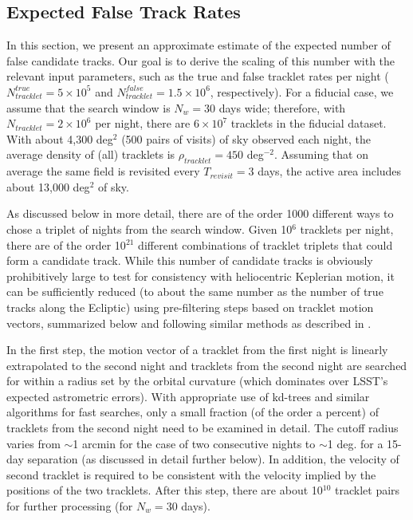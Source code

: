 \subsection{Expected False Track Rates \label{sec:tracks} }

In this section, we present an approximate estimate of the expected number of false candidate tracks.
Our goal is to derive the scaling of this number with the relevant input parameters, such as the true and false
tracklet rates per night ($N_{tracklet}^{true}=5\times10^5$ and $N_{tracklet}^{false}=1.5\times10^6$, respectively).
For a fiducial case, we assume that the search window is $N_w= 30$ days wide;  therefore, with $N_{tracklet} = 2\times10^6$
per night, there are $6\times10^7$ tracklets in the fiducial dataset. With about 4,300 deg$^2$ (500 pairs of visits)
of sky observed each night, the average density of (all) tracklets is $\rho_{tracklet} = 450$ deg$^{-2}$. Assuming
that on average the same field is revisited every $T_{revisit}=3$ days, the active area includes about 13,000 deg$^2$
of sky.

As discussed below in more detail, there are of the order 1000 different ways to chose a triplet of nights
from the search window. Given 10$^6$ tracklets per night, there are of the order
10$^{21}$ different combinations of tracklet triplets that could form a candidate track.
While this number of candidate tracks is obviously prohibitively large to test for consistency
with heliocentric Keplerian motion, it can be sufficiently reduced (to about the same number
as the number of true tracks along the Ecliptic) using pre-filtering steps based on tracklet motion
vectors, summarized below and following similar methods as described in \citet{denneau13, kubica07}. 

In the first step, the motion vector of a tracklet from the first night is linearly extrapolated
to the second night and tracklets from the second night are searched for within a radius set
by the orbital curvature (which dominates over LSST's expected astrometric errors). With appropriate use of
kd-trees and similar algorithms for fast searches, only a small fraction (of the order a percent)
of tracklets from the second night need to be examined in detail. The cutoff radius varies
from $\sim$1 arcmin for the case of two consecutive nights to $\sim$1 deg. for a 15-day separation
(as discussed in detail further below). In addition, the velocity of second tracklet is required
to be consistent with the velocity implied by the positions of the two tracklets. After
this step, there are about 10$^{10}$ tracklet pairs for further processing (for $N_w=30$
days).

